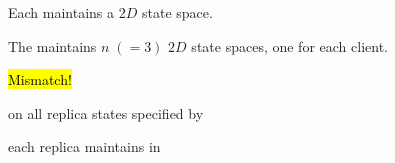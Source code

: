 \begin{frame}{}
  \centerline{\large Each  maintains a $2D$ state space.}


  \centerline{\large The  maintains $n \; (=3)$ $2D$ state spaces, one for each client.}
\end{frame}

\begin{frame}{}
  \begin{center}
    \hl{\Huge Mismatch!}
    
    \vspace{1.00cm}
    {\large {} on all replica states specified by \blue{\wlspec{}}}

    \vspace{0.20cm}
    \vspace{0.20cm}

    {\large {} each replica maintains in }
  \end{center}
\end{frame}
